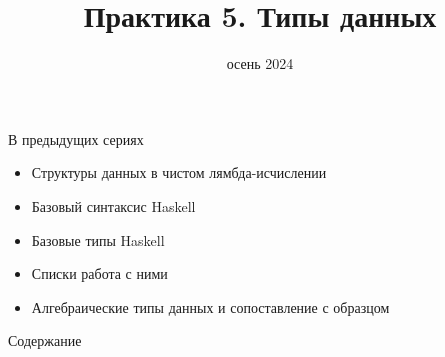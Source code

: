 
\newif\ifhandout




\title[5. Типы данных]{Практика 5. Типы данных}
\date{осень 2024}



    \setcounter{framenumber}{-1}
    \maketitle

    \begin{frame}[fragile]{В предыдущих сериях}
        \begin{itemize}
            \item Структуры данных в чистом лямбда-исчислении
            \item Базовый синтаксис Haskell
            \item Базовые типы Haskell
            \item[\newtopic] Списки работа с ними
            \item[\newtopic] Алгебраические типы данных и сопоставление с образцом
        \end{itemize}
    \end{frame}

    \begin{frame}[noframenumbering]{Содержание}
        \tableofcontents
    \end{frame}


